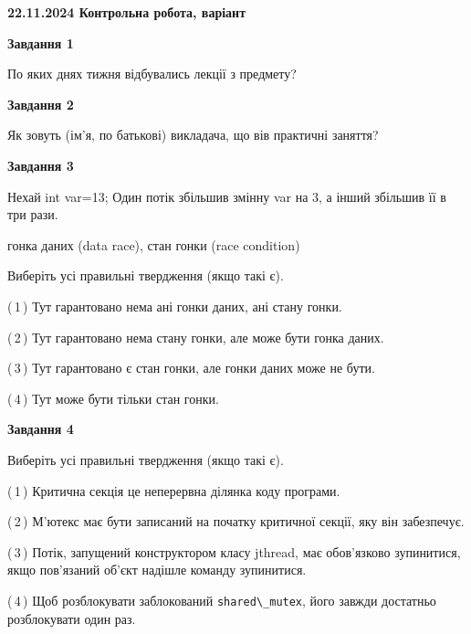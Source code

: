 \documentclass[12pt, ukrainian]{article}
\def\code#1{\Verb!#1!}
\begin{document}
\begin {large}

\textbf{22.11.2024 Контрольна робота, варіант  }\par


{

\begin{center}
\textbf{Завдання 1}
\end{center}

По яких днях тижня відбувались лекції з предмету?


\begin{center}
\textbf{Завдання 2}
\end{center}

Як зовуть (ім'я, по батькові) викладача, що вів практичні заняття?


\begin{center}
\textbf{Завдання 3}
\end{center}

Нехай int var=13; Один потік збільшив змінну var на 3, а інший збільшив її в три рази.

гонка даних (data race), стан гонки (race condition)

Виберіть усі правильні твердження (якщо такі є).\par
\vspace{2mm}
(\,1\,) Тут гарантовано нема ані гонки даних, ані стану гонки.%

(\,2\,) Тут гарантовано нема стану гонки, але може бути гонка даних.%

(\,3\,) Тут гарантовано є стан гонки, але гонки даних може не бути.%

(\,4\,) Тут може бути тільки стан гонки.%


\begin{center}
\textbf{Завдання 4}
\end{center}

Виберіть усі правильні твердження (якщо такі є).\par
\vspace{2mm}

(\,1\,) Критична секція це неперервна ділянка коду програми.%

(\,2\,) М’ютекс має бути записаний на початку критичної секції, яку він забезпечує.%

(\,3\,) Потік, запущений конструктором класу jthread, має обов’язково зупинитися, якщо пов’язаний об’єкт надішле команду зупинитися.%

(\,4\,) Щоб розблокувати заблокований \code{shared\_mutex}, його завжди достатньо розблокувати один раз.%


}
\end{large}
\end{document}
